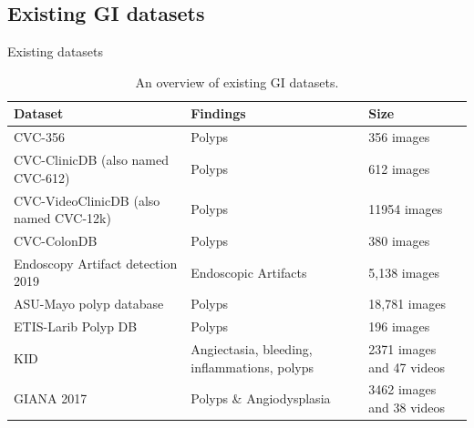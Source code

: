 \documentclass{libs/ufc_format}
\begin{document}
\subsection{Existing GI datasets}
\begin{frame}{Existing datasets}
    \begin{table}
        \caption{An overview of existing GI datasets.}
        \begin{adjustbox}{width=\textwidth}
            \begin{tabular}{|l|l|l|}
                \hline
                \rowcolor[HTML]{FFFFFF}
                \textbf{Dataset}                                                  & \textbf{Findings}                            & \textbf{Size}                     \\ \hline
                CVC-356 \cite{Bernal2012TowardsAP}                                & Polyps                                       & 356 images                        \\ \hline
                CVC-ClinicDB (also named CVC-612) \cite{Bernal2015WMDOVAMF}       & Polyps                                       & 612 images                        \\ \hline
                CVC-VideoClinicDB (also named CVC-12k) \cite{Bernal2012TowardsAP} & Polyps                                       & 11954 images                      \\ \hline
                CVC-ColonDB \cite{Bernal2012TowardsAP}                            & Polyps                                       & 380 images                        \\ \hline
                Endoscopy Artifact detection 2019 \cite{Ali2019EndoscopyAD}       & Endoscopic Artifacts                         & 5,138 images                      \\ \hline
                ASU-Mayo polyp database  \cite{Tajbakhsh2016AutomatedPD}          & Polyps                                       & 18,781 images                     \\ \hline
                ETIS-Larib Polyp DB \cite{Silva2013TowardED}                      & Polyps                                       & 196 images                        \\ \hline
                KID \cite{Koulaouzidis2017KIDPA}                                  & Angiectasia, bleeding, inflammations, polyps & 2371 images and 47 videos         \\ \hline
                GIANA 2017  \cite{Guo2019GIANAPS}                                 & Polyps \& Angiodysplasia                     & 3462 images and 38 videos         \\ \hline

\end{tabular}
\end{adjustbox}
\end{table}
\end{frame}
\end{document}
